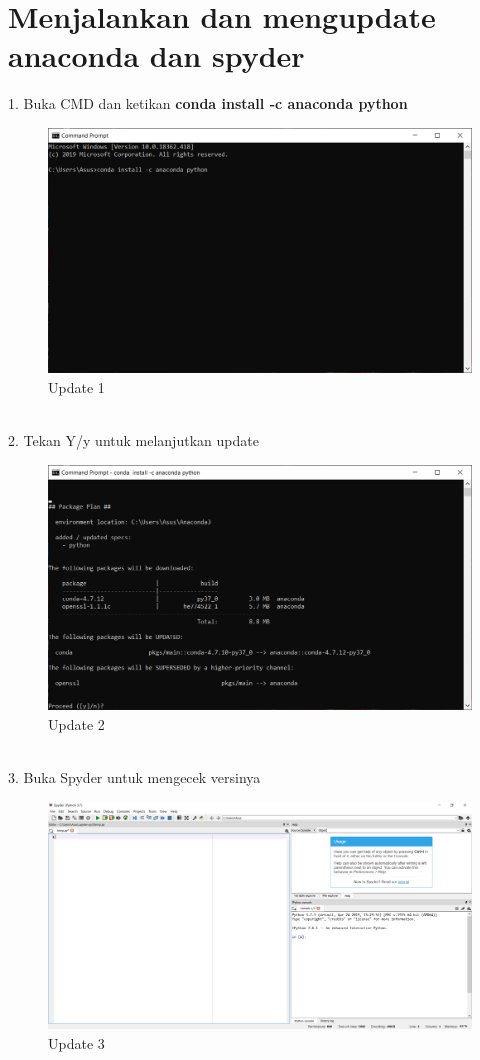 \documentclass[12pt, times new roman, a4paper]{article}
\begin{document}
\section{Menjalankan dan mengupdate anaconda dan spyder}
1. Buka CMD dan ketikan \textbf{conda install -c anaconda python}\\
\begin{figure}[h]
	\centering
		\includegraphics[scale=0.4]{Gambar/U1}
	\caption{Update 1}
\end{figure}
\\
2. Tekan Y/y untuk melanjutkan update\\
\begin{figure}[h]
	\centering
		\includegraphics[scale=0.4]{Gambar/U2}
	\caption{Update 2}
\end{figure}
\\
3. Buka Spyder untuk mengecek versinya\\
\begin{figure}[h]
	\centering
		\includegraphics[scale=0.2]{Gambar/U3}
		\caption{Update 3}
\end{figure}
\end{document}
